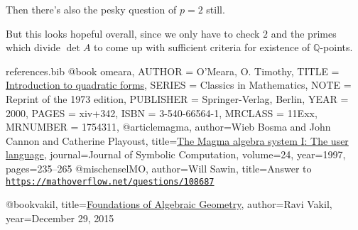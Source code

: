 \documentclass[10pt,a4paper]{amsart}
\numberwithin{equation}{section}
\numberwithin{figure}{section}
\theoremstyle{definition}
\theoremstyle{remark}
\theoremstyle{plain}
\theoremstyle{plain}
\theoremstyle{definition}
\theoremstyle{plain}
\theoremstyle{plain}
\newcommand{\Q}{\mathbb{Q}}
\begin{document}
	Then there's also the pesky question of $p=2$ still.
	
	But this looks hopeful overall, since we only have to check $2$ and the primes which divide $\det A$ to come up with sufficient criteria for existence of $\Q$-points.

\begin{filecontents}{references.bib}
@book {omeara,
    AUTHOR = {O'Meara, O. Timothy},
     TITLE = {\href{https://link.springer.com/book/10.1007\%2F978-3-642-62031-7}{Introduction to quadratic forms}},
    SERIES = {Classics in Mathematics},
      NOTE = {Reprint of the 1973 edition},
 PUBLISHER = {Springer-Verlag, Berlin},
      YEAR = {2000},
     PAGES = {xiv+342},
      ISBN = {3-540-66564-1},
   MRCLASS = {11Exx},
  MRNUMBER = {1754311},
}
@article{magma,
author={Wieb Bosma and John Cannon and Catherine Playoust},
title={\href{http://www.sciencedirect.com/science/article/pii/S074771719690125X}{The Magma algebra system {I}: The user language}},
journal={Journal of Symbolic Computation},
volume={24},
year={1997},
pages={235--265}
}
@misc{henselMO,
	author={Will Sawin},
	title={Answer to \href{https://mathoverflow.net/questions/108687}{\texttt{https://mathoverflow.net/questions/108687}}}
}

@book{vakil,
title={\href{http://math.stanford.edu/~vakil/216blog/index.html}{Foundations of Algebraic Geometry}},
author={Ravi Vakil},
year={December 29, 2015}
}
\end{filecontents}



\end{document}
